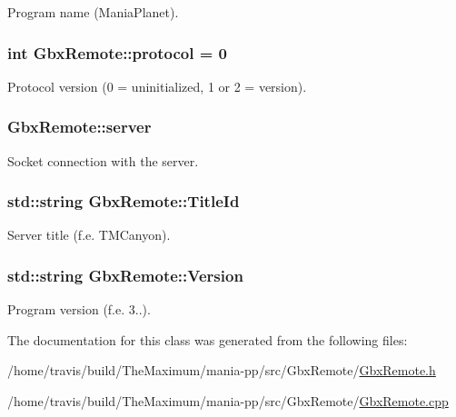 Program name (Mania\-Planet). 

\hypertarget{classGbxRemote_a5ee5c7087085cb6cb2e7bc6135ff0646}{
\subsubsection[{protocol}]{\setlength{\rightskip}{0pt plus 5cm}int Gbx\-Remote\-::protocol = 0\hspace{0.3cm}{\ttfamily [private]}}}\label{classGbxRemote_a5ee5c7087085cb6cb2e7bc6135ff0646}


Protocol version (0 = uninitialized, 1 or 2 = version). 

\hypertarget{classGbxRemote_a0b0b212b945da4266fb645affdac81cb}{
\subsubsection[{server}]{ Gbx\-Remote\-::server\hspace{0.3cm}{\ttfamily [private]}}}\label{classGbxRemote_a0b0b212b945da4266fb645affdac81cb}


Socket connection with the server. 

\hypertarget{classGbxRemote_a12d98a9add104392142ec8494dd022df}{
\subsubsection[{Title\-Id}]{\setlength{\rightskip}{0pt plus 5cm}std\-::string Gbx\-Remote\-::\-Title\-Id}}\label{classGbxRemote_a12d98a9add104392142ec8494dd022df}


Server title (f.\-e. T\-M\-Canyon). 

\hypertarget{classGbxRemote_a654b4cae6e4eed717d602700a90fcc27}{
\subsubsection[{Version}]{\setlength{\rightskip}{0pt plus 5cm}std\-::string Gbx\-Remote\-::\-Version}}\label{classGbxRemote_a654b4cae6e4eed717d602700a90fcc27}


Program version (f.\-e. 3..). 



The documentation for this class was generated from the following files\-:\begin{DoxyCompactItemize}
\item 
/home/travis/build/\-The\-Maximum/mania-\/pp/src/\-Gbx\-Remote/\hyperlink{GbxRemote_8h}{Gbx\-Remote.\-h}\item 
/home/travis/build/\-The\-Maximum/mania-\/pp/src/\-Gbx\-Remote/\hyperlink{GbxRemote_8cpp}{Gbx\-Remote.\-cpp}\end{DoxyCompactItemize}
